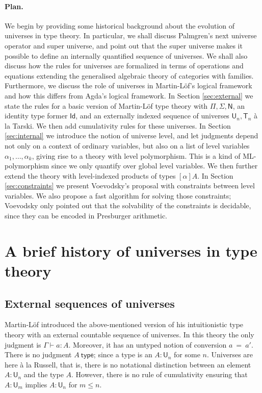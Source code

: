 \documentclass[11pt,a4paper]{article}
\newcommand{\Id}{\mathsf{Id}}
\newcommand{\conv}{=}
\def\NN{\mathsf{N}}
\def\UU{\mathsf{U}}
\newcommand{\type}{\mathsf{type}}
\newcommand{\T}{\mathsf{T}}
\begin{document}
\paragraph{Plan.} We begin by providing some historical background about the evolution of universes in type theory. In particular, we shall discuss Palmgren's next universe operator and super universe, and point out that the super universe makes it possible to define an internally quantified sequence of universes. We shall also discuss how the rules for universes are formalized in terms of operations and equations extending the generalised algebraic theory of categories with families. Furthermore, we discuss the role of universes in Martin-Löf's logical framework and how this differs from Agda's logical framework. In Section \ref{sec:external} we state the rules for a basic version of Martin-Löf type theory with $\Pi, \Sigma, \NN$, an identity type former $\Id$, and an externally indexed sequence of universes $\UU_n, \T_n$ \`a la Tarski. We then add cumulativity rules for these universes. In Section \ref{sec:internal} we introduce the notion of universe level, and let judgments depend not only on a context of ordinary variables, but also on a list of level variables $\alpha_1, \ldots, \alpha_k$, giving rise to a theory with level polymorphism. This is a kind of ML-polymorphism since we only quantify over global level variables. We then further extend the theory with level-indexed products of types $[\alpha]A$. In Section \ref{sec:constraints} we present Voevodsky's proposal with constraints between level variables. We also propose a fast algorithm for solving those constraints; Voevodsky only pointed out that the solvability of the constraints is decidable, since they can be encoded in Presburger arithmetic.

\section{A brief history of universes in type theory}\label{sec:history}

\subsection{External sequences of universes}\label{sec:palmgren}

Martin-Löf \cite{martinlof:predicative} introduced the above-mentioned version of his intuitionistic type theory with an external countable sequence of universes. In this theory the only judgment is  $\Gamma \vdash a : A$. Moreover, it has an untyped notion of conversion $a\ \conv\ a'$. There is no judgment $A\ \type$; since a type is an $A : \UU_n$ for some $n$. Universes are here \`a la Russell, that is, there is no notational distinction between an element $A : \UU_n$ and the type $A$. However, there is no rule of cumulativity ensuring that $A : \UU_m$ implies $A : \UU_n$ for $m \leq n$.
\end{document}

